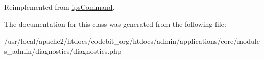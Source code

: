 Reimplemented from \hyperlink{classips_command_afbc4e912a0604b94d47d66744c64d8ba}{ips\-Command}.



The documentation for this class was generated from the following file\-:\begin{DoxyCompactItemize}
\item 
/usr/local/apache2/htdocs/codebit\-\_\-org/htdocs/admin/applications/core/modules\-\_\-admin/diagnostics/diagnostics.\-php\end{DoxyCompactItemize}

